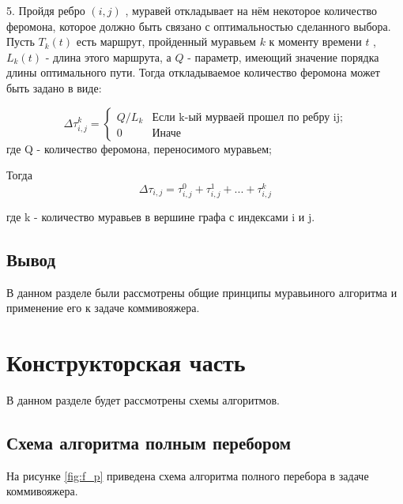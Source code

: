 \documentclass[a4paper, 14pt]{article}
\begin{document}
	5. Пройдя ребро $(i,j)$ , муравей откладывает на нём некоторое количество феромона, которое должно быть связано с оптимальностью сделанного выбора. Пусть $T _{k} (t)$ есть маршрут, пройденный муравьем $k$ к моменту времени $t$ , $L _{k} (t)$ - длина этого маршрута, а $Q$ - параметр, имеющий значение порядка длины оптимального пути. Тогда откладываемое количество феромона может быть задано в виде:
	
 \begin{equation}\label{form:add} 
    {\displaystyle \Delta \tau _{i,j}^k={\begin{cases}Q/L_{k}& {\mbox{Если k-ый мурваей прошел по ребру ij;}}\\0&{\mbox{Иначе}}\end{cases}}}
\end{equation}
   где \quad Q - количество феромона, переносимого муравьем;
   
 Тогда
 \begin{equation}\label{form:add1} 
    \Delta \tau _{i,j}= \tau _{i,j}^0 + \tau _{i,j}^1 + ... + \tau _{i,j}^k 
\end{equation}
   
    где k - количество муравьев в вершине графа с индексами i и j.

	
    \subsection{Вывод}
	В данном разделе были рассмотрены общие принципы муравьиного алгоритма и применение его к задаче коммивояжера. 
		\newpage
        \section{Конструкторская часть}
        В данном разделе будет рассмотрены схемы алгоритмов.
        \subsection{Схема алгоритма полным перебором}
        На рисунке \ref{fig:f_p} приведена схема алгоритма полного перебора в задаче коммивояжера.\\
\end{document}
